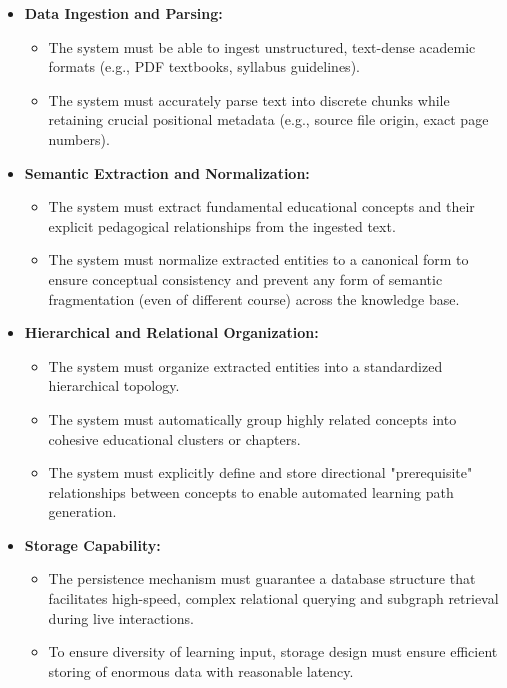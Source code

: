 \begin{itemize}
    \item \textbf{Data Ingestion and Parsing:} 
    \begin{itemize}
        \item The system must be able to ingest unstructured, text-dense academic formats (e.g., PDF textbooks, syllabus guidelines).
        \item The system must accurately parse text into discrete chunks while retaining crucial positional metadata (e.g., source file origin, exact page numbers).
    \end{itemize}
    
    \item \textbf{Semantic Extraction and Normalization:}
    \begin{itemize}
        \item The system must extract fundamental educational concepts and their explicit pedagogical relationships from the ingested text.
        \item The system must normalize extracted entities to a canonical form to ensure conceptual consistency and prevent any form of semantic fragmentation (even of different course) 
        across the knowledge base.
    \end{itemize}
    
    \item \textbf{Hierarchical and Relational Organization:}
    \begin{itemize}
        \item The system must organize extracted entities into a standardized hierarchical topology.
        \item The system must automatically group highly related concepts into cohesive educational clusters or chapters.
        \item The system must explicitly define and store directional "prerequisite" relationships between concepts to enable automated learning path generation.
    \end{itemize}
    
    \item \textbf{Storage Capability:}
    \begin{itemize}
        \item The persistence mechanism must guarantee a database structure that facilitates high-speed, complex relational querying and subgraph retrieval during live 
        interactions.
        \item To ensure diversity of learning input, storage design must ensure efficient storing of enormous data with reasonable latency. 
    \end{itemize}
\end{itemize}

